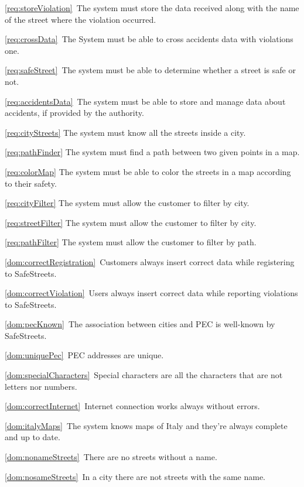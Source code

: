 \begin{description}
\begin{description}
					\item \ref{req:storeViolation}\ The system must store the data received along with the name of the street where the violation occurred.
					\item \ref{req:crossData}\ The System must be able to cross accidents data with violations one.
					\item \ref{req:safeStreet}\ The system must be able to determine whether a street is safe or not.
					\item \ref{req:accidentsData}\ The system must be able to store and manage data about accidents, if provided by the authority.
					\item \ref{req:cityStreets} The system must know all the streets inside a city.
					\item \ref{req:pathFinder} The system must find a path between two given points in a map.
					\item \ref{req:colorMap} The system must be able to color the streets in a map according to their safety.
					\item \ref{req:cityFilter} The system must allow the customer to filter by city.
					\item \ref{req:streetFilter} The system must allow the customer to filter by city.
					\item \ref{req:pathFilter} The system must allow the customer to filter by path.
					\item \ref{dom:correctRegistration}\ Customers always insert correct data while registering to SafeStreets.
					\item \ref{dom:correctViolation}\ Users always insert correct data while reporting violations to SafeStreets.
					\item \ref{dom:pecKnown}\ The association between cities and PEC is well-known by SafeStreets.
					\item \ref{dom:uniquePec}\ PEC addresses are unique.
					\item \ref{dom:specialCharacters}\ Special characters are all the characters that are not letters nor numbers.
					\item \ref{dom:correctInternet}\ Internet connection works always without errors.
					\item \ref{dom:italyMaps}\ The system knows maps of Italy and they’re always complete and up to date.
					\item \ref{dom:nonameStreets}\ There are no streets without a name.
					\item \ref{dom:nosameStreets}\ In a city there are not streets with the same name.

\end{description}
\end{description}
